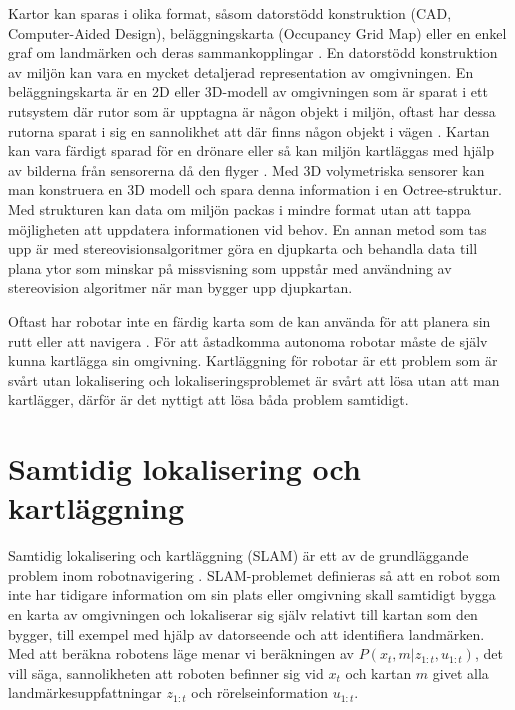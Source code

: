 Kartor kan sparas i olika format, såsom datorstödd konstruktion (CAD, Computer-Aided Design), beläggningskarta (Occupancy Grid Map) eller en enkel graf om landmärken och deras sammankopplingar \citep{982903}. En datorstödd konstruktion av miljön kan vara en mycket detaljerad representation av omgivningen. En beläggningskarta är en 2D eller 3D-modell av omgivningen som är sparat i ett rutsystem där rutor som är upptagna är någon objekt i miljön, oftast har dessa rutorna sparat i sig en sannolikhet att där finns någon objekt i vägen \citep{6095058, 982903}. Kartan kan vara färdigt sparad för en drönare eller så kan miljön kartläggas med hjälp av bilderna från sensorerna då den flyger \citep{geospatial}. Med 3D volymetriska sensorer kan man konstruera en 3D modell och spara denna information i en Octree-struktur. Med strukturen kan data om miljön packas i mindre format utan att tappa möjligheten att uppdatera informationen vid behov. En annan metod som tas upp är med stereovisionsalgoritmer göra en djupkarta och behandla data till plana ytor som minskar på missvisning som uppstår med användning av stereovision algoritmer när man bygger upp djupkartan. 

Oftast har robotar inte en färdig karta som de kan använda för att planera sin rutt eller att navigera \citep{ProbabilisticRobotics}. För att åstadkomma autonoma robotar måste de själv kunna kartlägga sin omgivning. Kartläggning för robotar är ett problem som är svårt utan lokalisering och lokaliseringsproblemet är svårt att lösa utan att man kartlägger, därför är det nyttigt att lösa båda problem samtidigt. 

\chapter{Samtidig lokalisering och kartläggning} \label{slamchap}

Samtidig lokalisering och kartläggning (SLAM) är ett av de grundläggande problem inom robotnavigering \citep{realslamproblem}. SLAM-problemet definieras så att en robot som inte har tidigare information om sin plats eller omgivning skall samtidigt bygga en karta av omgivningen och lokaliserar sig själv relativt till kartan som den bygger, till exempel med hjälp av datorseende och att identifiera landmärken. Med att beräkna robotens läge menar vi beräkningen av $P(x_t, m|z_{1:t}, u_{1:t})$, det vill säga, sannolikheten att roboten befinner sig vid $x_t$ och kartan $m$ givet alla landmärkesuppfattningar $z_{1:t}$ och rörelseinformation $u_{1:t}$. 

